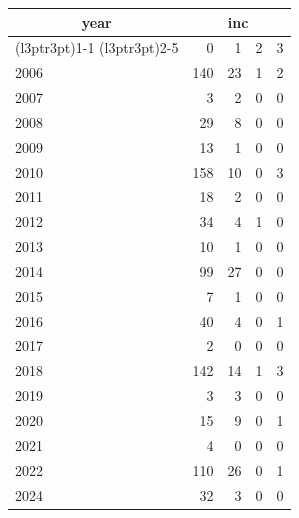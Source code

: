 \footnotesize\begin{tabular}[t]{lrrrr}
\toprule
\multicolumn{1}{c}{year} & \multicolumn{4}{c}{inc} \\
\cmidrule(l{3pt}r{3pt}){1-1} \cmidrule(l{3pt}r{3pt}){2-5}
  & 0 & 1 & 2 & 3\\
\midrule
2006 & 140 & 23 & 1 & 2\\
2007 & 3 & 2 & 0 & 0\\
2008 & 29 & 8 & 0 & 0\\
2009 & 13 & 1 & 0 & 0\\
2010 & 158 & 10 & 0 & 3\\
2011 & 18 & 2 & 0 & 0\\
2012 & 34 & 4 & 1 & 0\\
2013 & 10 & 1 & 0 & 0\\
2014 & 99 & 27 & 0 & 0\\
2015 & 7 & 1 & 0 & 0\\
2016 & 40 & 4 & 0 & 1\\
2017 & 2 & 0 & 0 & 0\\
2018 & 142 & 14 & 1 & 3\\
2019 & 3 & 3 & 0 & 0\\
2020 & 15 & 9 & 0 & 1\\
2021 & 4 & 0 & 0 & 0\\
2022 & 110 & 26 & 0 & 1\\
2024 & 32 & 3 & 0 & 0\\
\bottomrule
\end{tabular}
